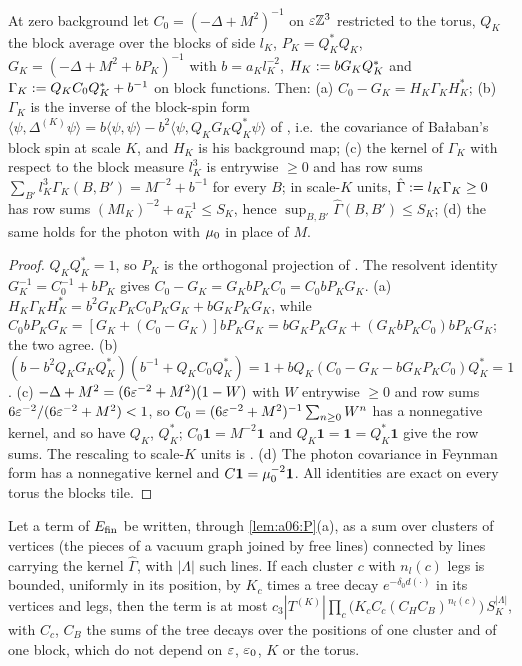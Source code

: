 \begin{lemma}\label{lem:a06:P}
At zero background let $C_0=(-\Delta+M^2)^{-1}$ on $\varepsilon\mathbb Z^3$ restricted to the torus, $Q_K$ the block average over the blocks of side $l_K$, $P_K=Q_K^*Q_K$, $G_K=(-\Delta+M^2+bP_K)^{-1}$ with $b=a_Kl_K^{-2}$, $H_K:= bG_KQ_K^*$ and $\Gamma_K:= Q_KC_0Q_K^*+b^{-1}$ on block functions. Then:
\textup{(a)} $C_0-G_K=H_K\Gamma_KH_K^*$;
\textup{(b)} $\Gamma_K$ is the inverse of the block-spin form $\langle\psi,\Delta^{(K)}\psi\rangle=b\langle\psi,\psi\rangle-b^2\langle\psi,Q_KG_KQ_K^*\psi\rangle$ of \cite[(2.21)]{Ba1}, i.e.\ the covariance of Ba{\l}aban's block spin at scale $K$, and $H_K$ is his background map;
\textup{(c)} the kernel of $\Gamma_K$ with respect to the block measure $l_K^3$ is entrywise $\ge0$ and has row sums $\sum_{B'}l_K^3\Gamma_K(B,B')=M^{-2}+b^{-1}$ for every $B$; in scale-$K$ units, $\hat\Gamma:= l_K\Gamma_K\ge0$ has row sums $(Ml_K)^{-2}+a_K^{-1}\le S_K$, hence $\sup_{B,B'}\hat\Gamma(B,B')\le S_K$;
\textup{(d)} the same holds for the photon with $\mu_0$ in place of $M$.
\end{lemma}

\begin{proof}
$Q_KQ_K^*=1$, so $P_K$ is the orthogonal projection of \cite[(2.20)]{Ba1}. The resolvent identity $G_K^{-1}=C_0^{-1}+bP_K$ gives $C_0-G_K=G_KbP_KC_0=C_0bP_KG_K$. (a) $H_K\Gamma_KH_K^*=b^2G_KP_KC_0P_KG_K+bG_KP_KG_K$, while $C_0bP_KG_K=[G_K+(C_0-G_K)]bP_KG_K=bG_KP_KG_K+(G_KbP_KC_0)bP_KG_K$; the two agree. (b) $(b-b^2Q_KG_KQ_K^*)(b^{-1}+Q_KC_0Q_K^*)=1+bQ_K(C_0-G_K-bG_KP_KC_0)Q_K^*=1$. (c) $-\Delta+M^2=(6\varepsilon^{-2}+M^2)(1-W)$ with $W$ entrywise $\ge0$ and row sums $6\varepsilon^{-2}/(6\varepsilon^{-2}+M^2)<1$, so $C_0=(6\varepsilon^{-2}+M^2)^{-1}\sum_{n\ge0}W^n$ has a nonnegative kernel, and so have $Q_K$, $Q_K^*$; $C_0\mathbf 1=M^{-2}\mathbf 1$ and $Q_K\mathbf 1=\mathbf 1=Q_K^*\mathbf 1$ give the row sums. The rescaling to scale-$K$ units is \cite[(2.22)]{Ba1}. (d) The photon covariance in Feynman form has a nonnegative kernel and $C\mathbf 1=\mu_0^{-2}\mathbf 1$. All identities are exact on every torus the blocks tile.
\end{proof}

\begin{lemma}\label{lem:a06:W}
Let a term of $E_{\mathrm{fin}}$ be written, through \cref{lem:a06:P}(a), as a sum over clusters of vertices (the pieces of a vacuum graph joined by free lines) connected by lines carrying the kernel $\hat\Gamma$, with $|\Lambda|$ such lines. If each cluster $c$ with $n_l(c)$ legs is bounded, uniformly in its position, by $K_c$ times a tree decay $e^{-\delta_0d(\cdot)}$ in its vertices and legs, then the term is at most $c_3|T^{(K)}|\prod_c\big(K_cC_c(C_HC_B)^{n_l(c)}\big)\,S_K^{|\Lambda|}$, with $C_c$, $C_B$ the sums of the tree decays over the positions of one cluster and of one block, which do not depend on $\varepsilon$, $\varepsilon_0$, $K$ or the torus.
\end{lemma}

